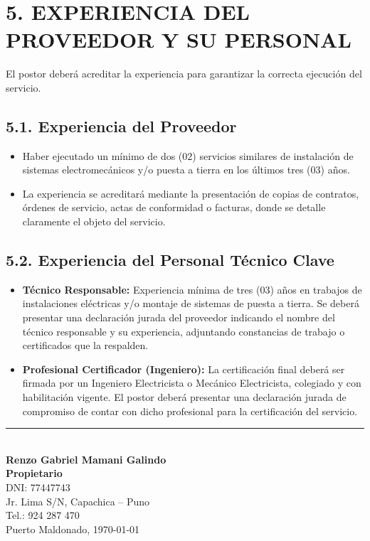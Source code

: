 \documentclass[12pt,a4paper]{article}
\begin{document}
\section*{5. EXPERIENCIA DEL PROVEEDOR Y SU PERSONAL}

El postor deberá acreditar la experiencia para garantizar la correcta ejecución del servicio.

\subsection*{5.1. Experiencia del Proveedor}

\begin{itemize}
  \item Haber ejecutado un mínimo de dos (02) servicios similares de instalación de sistemas electromecánicos y/o puesta a tierra en los últimos tres (03) años.
  \item La experiencia se acreditará mediante la presentación de copias de contratos, órdenes de servicio, actas de conformidad o facturas, donde se detalle claramente el objeto del servicio.
\end{itemize}

\subsection*{5.2. Experiencia del Personal Técnico Clave}

\begin{itemize}
  \item \textbf{Técnico Responsable:} Experiencia mínima de tres (03) años en trabajos de instalaciones eléctricas y/o montaje de sistemas de puesta a tierra. Se deberá presentar una declaración jurada del proveedor indicando el nombre del técnico responsable y su experiencia, adjuntando constancias de trabajo o certificados que la respalden.
  \item \textbf{Profesional Certificador (Ingeniero):} La certificación final deberá ser firmada por un Ingeniero Electricista o Mecánico Electricista, colegiado y con habilitación vigente. El postor deberá presentar una declaración jurada de compromiso de contar con dicho profesional para la certificación del servicio.
\end{itemize}

\vspace{1cm}

\begin{center}
\rule{8cm}{0.4pt} \\
{\large\textbf{Renzo Gabriel Mamani Galindo}} \\
\textbf{Propietario} \\
DNI: 77447743 \\
Jr. Lima S/N, Capachica -- Puno \\
Tel.: 924 287 470 \\
\medskip
Puerto Maldonado, \today
\end{center}
\end{document}
